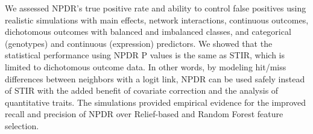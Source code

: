 \documentclass{bioinfo}
\begin{document}
We assessed NPDR's true positive rate and ability to control false positives using realistic simulations with main effects, network interactions, continuous outcomes, dichotomous outcomes with balanced and imbalanced classes, and categorical (genotypes) and continuous (expression) predictors.
We showed that the statistical performance using NPDR P values is the same as STIR, which is limited to dichotomous outcome data.
In other words, by modeling hit/miss differences between neighbors with a logit link, NPDR can be used safely instead of STIR with the added benefit of covariate correction and the analysis of quantitative traits.
The simulations provided empirical evidence for the improved recall and precision of NPDR over Relief-based and Random Forest feature selection.

\end{document}

